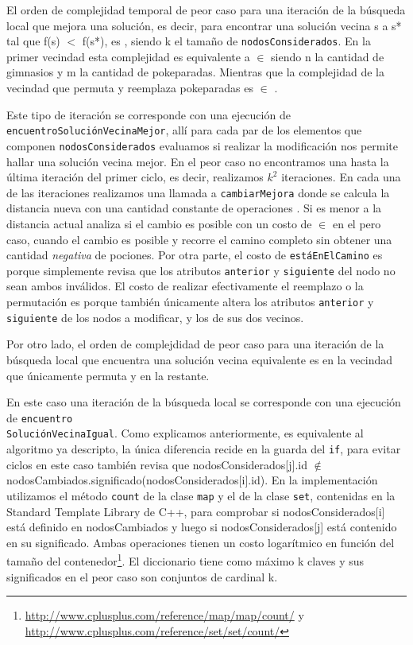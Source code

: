El orden de complejidad temporal de peor caso para una iteraci\'on de la b\'usqueda local que mejora una soluci\'on, es decir, para encontrar una soluci\'on vecina s a s* tal que f(s) $<$ f(s*), es , siendo k el tamaño de \texttt{nodosConsiderados}. En la primer vecindad esta complejidad es equivalente a  $\in$  siendo n la cantidad de gimnasios y m la cantidad de pokeparadas. Mientras que la complejidad de la vecindad que permuta y reemplaza pokeparadas es  $\in$ .

Este tipo de iteraci\'on se corresponde con una ejecuci\'on de \texttt{encuentroSoluci\'onVecinaMejor}, all\'i para cada par de los elementos que componen \texttt{nodosConsiderados} evaluamos si realizar la modificaci\'on nos permite hallar una soluci\'on vecina mejor. En el peor caso no encontramos una hasta la \'ultima iteraci\'on del primer ciclo, es decir, realizamos $k^2$ iteraciones. En cada una de las iteraciones realizamos una llamada a \texttt{cambiarMejora} donde se calcula la distancia nueva con una cantidad constante de operaciones . Si es menor a la distancia actual analiza si el cambio es posible con un costo de  $\in$  en el pero caso, cuando el cambio es posible y recorre el camino completo sin obtener una cantidad \textit{negativa} de pociones. Por otra parte, el costo de \texttt{est\'aEnElCamino} es  porque simplemente revisa que los atributos \texttt{anterior} y \texttt{siguiente} del nodo no sean ambos inv\'alidos. El costo de realizar efectivamente el reemplazo o la permutaci\'on es  porque tambi\'en \'unicamente altera los atributos \texttt{anterior} y \texttt{siguiente} de los nodos a modificar, y los de sus dos vecinos.

Por otro lado, el orden de complejdidad de peor caso para una iteraci\'on de la b\'usqueda local que encuentra una soluci\'on vecina equivalente es  en la vecindad que \'unicamente permuta y  en la restante.

En este caso una iteraci\'on de la b\'usqueda local se corresponde con una ejecuci\'on de \texttt{encuentro\\ Soluci\'onVecinaIgual}. Como explicamos anteriormente, es equivalente al algoritmo ya descripto, la \'unica diferencia recide en la guarda del \texttt{if}, para evitar ciclos en este caso tambi\'en revisa que nodosConsiderados[j].id $\notin$ nodosCambiados.significado(nodosConsiderados[i].id). En la implementaci\'on utilizamos el m\'etodo \texttt{count} de la clase \texttt{map} y el de la clase \texttt{set}, contenidas en la Standard Template Library de C++, para comprobar si nodosConsiderados[i] est\'a definido en nodosCambiados y luego si nodosConsiderados[j] est\'a contenido en su significado. Ambas operaciones tienen un costo logar\'itmico en funci\'on del tamaño del contenedor\footnote{\url{http://www.cplusplus.com/reference/map/map/count/} y \url{http://www.cplusplus.com/reference/set/set/count/}}. El diccionario tiene como m\'aximo k claves y sus significados en el peor caso son conjuntos de cardinal k.

